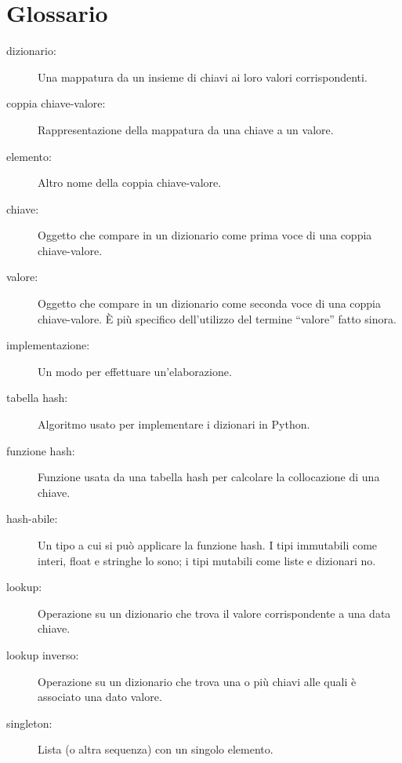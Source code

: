 \documentclass[10pt]{book}
\begin{document}
\section{Glossario}

\begin{description}

\item[dizionario:] Una mappatura da un insieme di chiavi ai loro valori corrispondenti.

\item[coppia chiave-valore:] Rappresentazione della mappatura da una chiave a un valore.

\item[elemento:] Altro nome della coppia chiave-valore.

\item[chiave:] Oggetto che compare in un dizionario come prima voce di una coppia chiave-valore.

\item[valore:] Oggetto che compare in un dizionario come seconda voce di una coppia chiave-valore. È più specifico dell'utilizzo del termine ``valore'' fatto sinora.

\item[implementazione:] Un modo per effettuare un'elaborazione.

\item[tabella hash:] Algoritmo usato per implementare i dizionari in Python.

\item[funzione hash:] Funzione usata da una tabella hash per calcolare la collocazione di una chiave.

\item[hash-abile:] Un tipo a cui si può applicare la funzione hash. I tipi immutabili come interi, float e stringhe lo sono; i tipi mutabili come liste e dizionari no.

\item[lookup:] Operazione su un dizionario che trova il valore corrispondente a una data chiave.

\item[lookup inverso:] Operazione su un dizionario che trova una o più chiavi alle quali è associato una dato valore.

\item[singleton:] Lista (o altra sequenza) con un singolo elemento.


\end{description}
\end{document}
